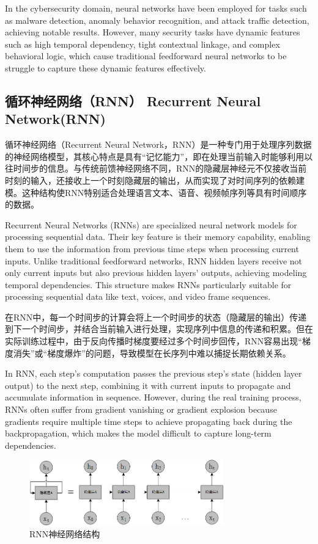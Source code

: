 In the cybersecurity domain, neural networks have been employed for tasks such as malware detection, anomaly behavior recognition, and attack traffic detection, achieving notable results. However, many security tasks have dynamic features such as high temporal dependency, tight contextual linkage, and complex behavioral logic, which cause traditional feedforward neural networks to be struggle to capture these dynamic features effectively.

\subsection{循环神经网络（RNN） Recurrent Neural Network(RNN)}

循环神经网络（Recurrent Neural Network，RNN）是一种专门用于处理序列数据的神经网络模型，其核心特点是具有“记忆能力”，即在处理当前输入时能够利用以往时间步的信息。与传统前馈神经网络不同，RNN的隐藏层神经元不仅接收当前时刻的输入，还接收上一个时刻隐藏层的输出，从而实现了对时间序列的依赖建模。这种结构使RNN特别适合处理语言文本、语音、视频帧序列等具有时间顺序的数据。

Recurrent Neural Networks (RNNs) are specialized neural network models for processing sequential data. Their key feature is their memory capability, enabling them to use the information from previous time steps when processing current inputs. Unlike traditional feedforward networks, RNN hidden layers receive not only current inputs but also previous hidden layers’ outputs, achieving modeling temporal dependencies. This structure makes RNNs particularly suitable for processing sequential data like text, voices, and video frame sequences.

在RNN中，每一个时间步的计算会将上一个时间步的状态（隐藏层的输出）传递到下一个时间步，并结合当前输入进行处理，实现序列中信息的传递和积累。但在实际训练过程中，由于反向传播时梯度要经过多个时间步回传，RNN容易出现“梯度消失”或“梯度爆炸”的问题，导致模型在长序列中难以捕捉长期依赖关系。

In RNN, each step's computation passes the previous step's state (hidden layer output) to the next step, combining it with current inputs to propagate and accumulate information in sequence. However, during the real training process, RNNs often suffer from gradient vanishing or gradient explosion because gradients require multiple time steps to achieve propagating back during the backpropagation, which makes the model difficult to capture long-term dependencies.

\begin{figure}[hbt]
	\centering
	\includegraphics[width=0.75\textwidth]{figures/2.4}
	\caption{RNN神经网络结构}\label{fig:2.4}
\end{figure}

